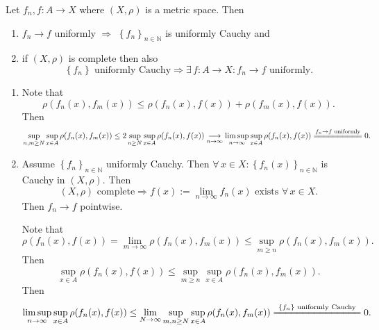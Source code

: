 \documentclass{notes}
\begin{document}
\begin{lem}
  Let $f_n, f \colon A \to X$ where $(X, \rho)$ is a metric space.
  Then
  \begin{enumerate}
    \item $f_n \to f$ uniformly $\Rightarrow$ $\left \{ f_n \right \}_{n \in \mathbb N}$ is uniformly Cauchy and 

    \item if $(X, \rho)$ is complete then also 
    \[
      \left \{ f_n \right \} \text{ uniformly Cauchy} \Rightarrow \exists \, f \colon A \to X: f_n \to f \text{ uniformly}.
    \]
  \end{enumerate}
\end{lem}

\begin{prf}
  \begin{enumerate}
    \item Note that 
    \[
      \rho(f_n(x), f_m(x)) \leq \rho(f_n(x), f(x)) + \rho(f_m(x), f(x)).
    \]
    Then 
    \[
      \sup_{n, m \geq N} \sup_{x \in A} \rho(f_n(x), f_m(x)) \leq 2 \sup_{n \geq N} \sup_{x \in A} \rho(f_n(x), f(x)) \underset{n \to \infty}{\longrightarrow} \limsup_{n \to \infty} \sup_{x \in A} \rho(f_n(x), f(x)) \overset{f_n \to f \text{ uniformly}}{=\joinrel=\joinrel=\joinrel=\joinrel=\joinrel=\joinrel=\joinrel=\joinrel=\joinrel=} 0.
    \]
    
    \item Assume $\left \{ f_n \right \}_{n \in \mathbb N}$ uniformly Cauchy.
    Then $\forall \, x \in X: \left \{ f_n(x) \right \}_{n \in \mathbb N}$ is Cauchy in $(X, \rho)$.
    Then 
    \[
      (X, \rho) \text{ complete} \Rightarrow f(x) := \lim_{n \to \infty} f_n(x) \text{ exists } \forall \, x \in X.
    \]
    Then $f_n \to f$ pointwise.
    
    Note that 
    \[
      \rho(f_n(x), f(x)) = \lim_{m \to \infty} \rho(f_n(x), f_m(x)) \leq \sup_{m \geq n} \rho(f_n(x), f_m(x)).
    \]
    Then 
    \[
      \sup_{x \in A} \rho(f_n(x), f(x)) \leq \sup_{m \geq n} \sup_{x \in A} \rho(f_n(x), f_m(x)).
    \]
    Then 
    \[
      \limsup_{n \to \infty} \sup_{x \in A} \rho(f_n(x), f(x)) \leq \lim_{N \to \infty} \sup_{m, n \geq N} \sup_{x \in A} \rho(f_n(x), f_m(x)) \overset{\left \{ f_n \right \} \text{ uniformly Cauchy}}{=\joinrel=\joinrel=\joinrel=\joinrel=\joinrel=\joinrel=\joinrel=\joinrel=\joinrel=\joinrel=\joinrel=\joinrel=\joinrel=\joinrel=} 0.
    \]
  \end{enumerate}
\end{prf}
\end{document}
